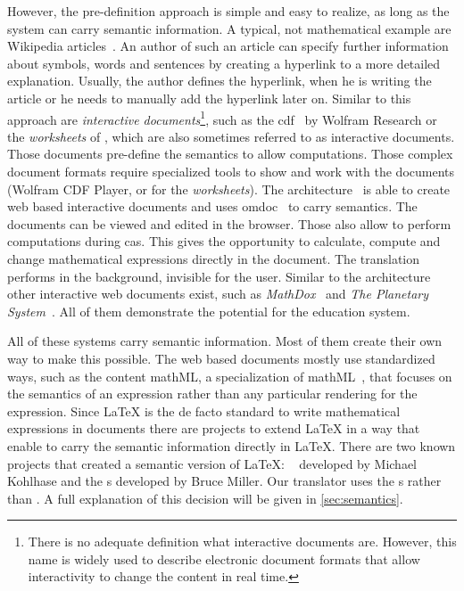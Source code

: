 However, the pre-definition approach is simple and easy to realize, as long as the system can carry semantic information. A typical, not mathematical example are Wikipedia articles~\cite{Wiki}. An author of such an article can specify further information about symbols, words and sentences by creating a hyperlink to a more detailed explanation. Usually, the author defines the hyperlink, when he is writing the article or he needs to manually add the hyperlink later on. Similar to this approach are \textit{interactive documents}\footnote{There is no adequate definition what interactive documents are. However, this name is widely used to describe electronic document formats that allow interactivity to change the content in real time.}, such as the \gls{cdf}~\cite{CDF:Wolfram} by Wolfram Research or the \textit{worksheets} of \Maple{}, which are also sometimes referred to as interactive documents. Those documents pre-define the semantics to allow computations. Those complex document formats require specialized tools to show and work with the documents (Wolfram CDF Player, or \Maple{} for the \textit{worksheets}). The \JOBAD{} architecture~\cite{JOBAD:orig} is able to create web based interactive documents and uses \gls{omdoc}~\cite{OMDoc} to carry semantics. The documents can be viewed and edited in the browser. Those  also allow to perform computations during \gls{cas}. This gives the opportunity to calculate, compute and change mathematical expressions directly in the document. The translation performs in the background, invisible for the user. Similar to the \JOBAD{} architecture other interactive web documents exist, such as \textit{MathDox}~\cite{MathDox} and \textit{The Planetary System}~\cite{Planetary}. All of them demonstrate the potential for the education system.

All of these systems carry semantic information. Most of them create their own way to make this possible. The web based documents mostly use standardized ways, such as the content \gls{mathML}, a specialization of \gls{mathML}~\cite{MathML}, that focuses on the semantics of an expression rather than any particular rendering for the expression. Since \LaTeX{} is the de facto standard to write mathematical expressions in documents there are projects to extend \LaTeX{} in a way that enable to carry the semantic information directly in \LaTeX. There are two known projects that created a semantic version of \LaTeX: \sTeX{}~\cite{sTeX} developed by Michael Kohlhase and the \Macro s developed by Bruce Miller. Our translator uses the \Macro s rather than \sTeX. A full explanation of this decision will be given in \cref{sec:semantics}.

